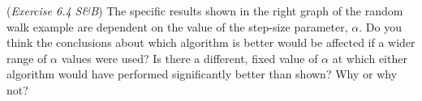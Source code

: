 (\textit{Exercise 6.4 S\&B})
The specific results shown in the right graph of the random walk example are dependent on the value of the step-size parameter, $\alpha$.
Do you think the conclusions about which algorithm is better would be affected if a wider range of $\alpha$ values were used?
Is there a different, fixed value of $\alpha$ at which either algorithm would have performed significantly better than shown? Why or why not?

